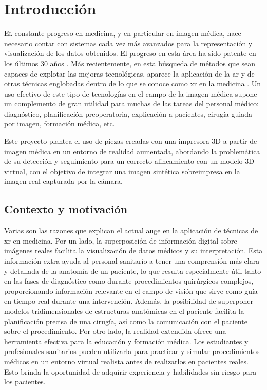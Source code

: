 \chapter{Introducción}
\label{chap:introducion}

\lettrine{E}{l} constante progreso en medicina, y en particular en imagen médica, hace necesario contar con sistemas cada vez más avanzados para la representación y visualización de los datos obtenidos. El progreso en esta área ha sido patente en los últimos 30 años \cite{Botha2014}. Más recientemente, en esta búsqueda de métodos que sean capaces de explotar las mejoras tecnológicas, aparece la aplicación de la \acrfull{ar} y de otras técnicas englobadas dentro de lo que se conoce como \acrfull{xr} en la medicina \cite{Sielhorst2008}. Un uso efectivo de este tipo de tecnologías en el campo de la imagen médica supone un complemento de gran utilidad para muchas de las tareas del personal médico: diagnóstico, planificación preoperatoria, explicación a pacientes, cirugía guiada por imagen, formación médica, etc.

Este proyecto plantea el uso de piezas creadas con una impresora 3D a partir de imagen médica en un entorno de realidad aumentada, abordando la problemática de su detección y seguimiento para un correcto alineamiento con un modelo 3D virtual, con el objetivo de integrar una imagen sintética sobreimpresa en la imagen real capturada por la cámara.


\section{Contexto y motivación}

Varias son las razones que explican el actual auge en la aplicación de técnicas de \acrshort{xr} en medicina. Por un lado, la superposición de información digital sobre imágenes reales facilita la visualización de datos médicos y su interpretación. Esta información extra ayuda al personal sanitario a tener una comprensión más clara y detallada de la anatomía de un paciente, lo que resulta especialmente útil tanto en las fases de diagnóstico como durante procedimientos quirúrgicos complejos, proporcionando información relevante en el campo de visión que sirve como guía en tiempo real durante una intervención. Además, la posibilidad de superponer modelos tridimensionales de estructuras anatómicas en el paciente facilita la planificación precisa de una cirugía, así como la comunicación con el paciente sobre el procedimiento. Por otro lado, la realidad extendida ofrece una herramienta efectiva para la educación y formación médica. Los estudiantes y profesionales sanitarios pueden utilizarla para practicar y simular procedimientos médicos en un entorno virtual realista antes de realizarlos en pacientes reales. Esto brinda la oportunidad de adquirir experiencia y habilidades sin riesgo para los pacientes.

